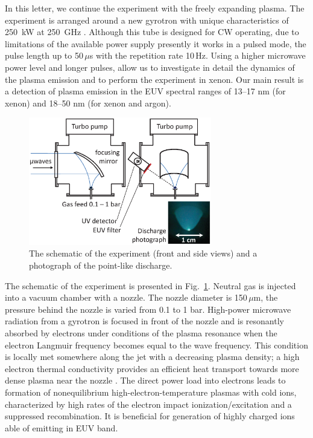 \documentclass[aip, apl, amsmath,amssymb, reprint]{revtex4-1}
\begin{document}
In this letter, we continue the experiment with the freely expanding plasma. The experiment is arranged around a new gyrotron with unique characteristics of 250~kW at 250~GHz \cite{subTHz2,subTHz3}. Although this tube is designed for CW operating, due to limitations of the available power supply presently it works in a pulsed mode, the pulse length up to 50$\,\mu$s with the repetition rate 10\,Hz. Using a higher microwave power level and longer pulses, allow us to investigate in detail the dynamics of the plasma emission and to perform the experiment in xenon. Our main result is a detection of plasma emission in the EUV spectral ranges of 13--17 nm (for xenon) and 18--50 nm (for xenon and argon). 

\begin{figure}[t]
\includegraphics[width=80mm]{FIG01}
\caption{The schematic of the experiment (front and side views) and a photograph of the point-like discharge.}\label{Fig01}
\end{figure}

The schematic of the experiment is presented in Fig.~\ref{Fig01}. Neutral gas is injected into a vacuum chamber with a nozzle. The nozzle diameter is 150$\,\mu$m, the pressure behind the nozzle is varied from 0.1 to 1 bar. High-power microwave radiation from a gyrotron is focused in front of the nozzle and is resonantly absorbed by electrons under conditions of the plasma resonance when the electron Langmuir frequency becomes equal to the wave frequency. This condition is locally met somewhere along the jet with a decreasing plasma density; a high electron thermal conductivity provides an efficient heat transport towards more dense plasma near the nozzle \cite{shalashov_jetp_2016}. The direct power load into electrons leads to formation of nonequilibrium high-electron-temperature plasmas with cold ions, %
characterized by high rates of the electron impact ionization/excitation and a suppressed recombination. It is beneficial for generation of highly charged ions able of emitting in EUV band. 
\end{document}
